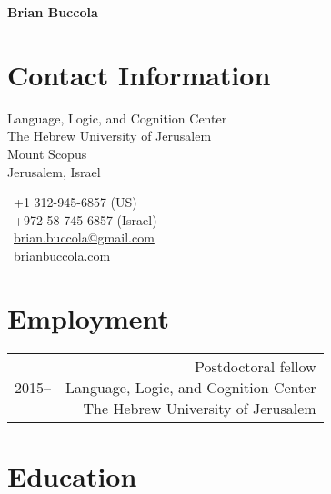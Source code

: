 \documentclass[11pt,letterpaper,twoside]{article}
\makeatletter
\newcommand{\bodywidth}{0.75}
\newenvironment{cvsection}{%
  \renewcommand{\arraystretch}{1.75}
  \begin{longtable}[l]{@{} L R @{}}
}{%
  \end{longtable}
}
\makeatother
\begin{document}
\thispagestyle{first}

\begin{center}
  {\Huge\bfseries Brian Buccola}
\end{center}

\vspace{2em}

\section*{Contact Information}

\begin{minipage}[t]{0.63\textwidth}
  Language, Logic, and Cognition Center\\
  The Hebrew University of Jerusalem\\
  Mount Scopus\\
  Jerusalem, Israel
\end{minipage}
\begin{minipage}[t]{0.36\textwidth}
  \Telefon\ +1 312-945-6857 {\footnotesize (US)}\\
  \Telefon\ +972 58-745-6857 {\footnotesize (Israel)}\\
  \Letter\ \href{mailto:brian.buccola@gmail.com}{\ttfamily brian.buccola@gmail.com}\\
  \Keyboard\ \href{http://brianbuccola.com/}{\ttfamily brianbuccola.com}
\end{minipage}

\section*{Employment}

\begin{cvsection}
  2015-- & \parbox[t]{\bodywidth\textwidth}{%
    Postdoctoral fellow\\
    Language, Logic, and Cognition Center\\
    The Hebrew University of Jerusalem
  }\\
\end{cvsection}

\section*{Education}
\end{document}
